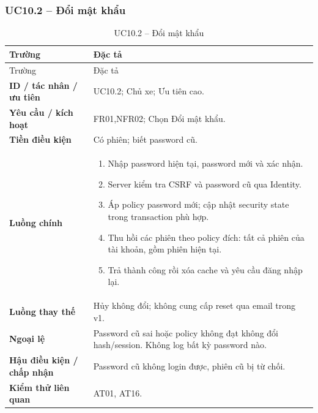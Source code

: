 \subsubsection{UC10.2 -- Đổi mật khẩu}\label{uc:UC10.2}
\begin{smalltable}\begin{longtable}{L{3.2cm}L{11.8cm}}
\caption{UC10.2 -- Đổi mật khẩu}\label{tab:UC10.2}\\
\toprule Trường & Đặc tả\\\midrule\endfirsthead
\toprule Trường & Đặc tả\\\midrule\endhead
\textbf{ID / tác nhân / ưu tiên} & UC10.2; Chủ xe; Ưu tiên cao.\\
\textbf{Yêu cầu / kích hoạt} & FR01,NFR02; Chọn Đổi mật khẩu.\\
\textbf{Tiền điều kiện} & Có phiên; biết password cũ.\\
\textbf{Luồng chính} & \begin{enumerate}[leftmargin=*,nosep]
\item Nhập password hiện tại, password mới và xác nhận.
\item Server kiểm tra CSRF và password cũ qua Identity.
\item Áp policy password mới; cập nhật security state trong transaction phù hợp.
\item Thu hồi các phiên theo policy đích: tất cả phiên của tài khoản, gồm phiên hiện tại.
\item Trả thành công rồi xóa cache và yêu cầu đăng nhập lại.
\end{enumerate}\\
\textbf{Luồng thay thế} & Hủy không đổi; không cung cấp reset qua email trong v1.\\
\textbf{Ngoại lệ} & Password cũ sai hoặc policy không đạt không đổi hash/session. Không log bất kỳ password nào.\\
\textbf{Hậu điều kiện / chấp nhận} & Password cũ không login được, phiên cũ bị từ chối.\\
\textbf{Kiểm thử liên quan} & AT01, AT16.\\
\bottomrule\end{longtable}\end{smalltable}
